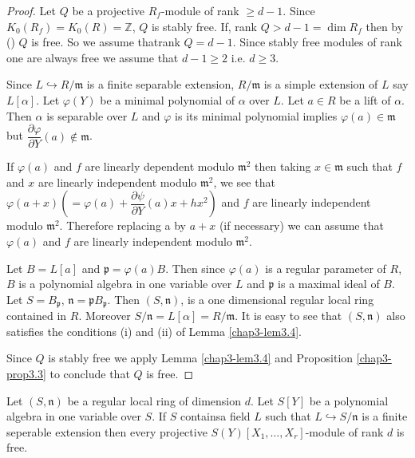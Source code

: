 \begin{proof}
Let $Q$ be a projective $R_{f}$-module of rank $\geq d-1$. Since
$K_{0}(R_{f})=K_{0}(R)=\mathbb{Z}$, $Q$ is stably free. If, rank
$Q>d-1=\dim R_{f}$ then by (\cite[Corollary 3.5, p. 184]{chap3-B}) $Q$ is
free. So we assume that\pageoriginale rank $Q=d-1$. Since stably free
modules of rank one are always free we assume that $d-1\geq 2$
i.e. $d\geq 3$.

Since $L\hookrightarrow R/\mathfrak{m}$ is a finite separable
extension, $R/\mathfrak{m}$ is a simple extension of $L$ say
$L[\alpha]$. Let $\varphi(Y)$ be a minimal polynomial of $\alpha$ over
$L$. Let $a\in R$ be a lift of $\alpha$. Then $\alpha$ is separable
over $L$ and $\varphi$ is its minimal polynomial implies
$\varphi(a)\in \mathfrak{m}$ but $\dfrac{\partial \varphi}{\partial
Y}(a)\not\in \mathfrak{m}$. 

If $\varphi(a)$ and $f$ are linearly dependent modulo
$\mathfrak{m}^{2}$ then taking $x\in \mathfrak{m}$ such that $f$ and
$x$ are linearly independent modulo $\mathfrak{m}^{2}$, we see that
$\varphi(a+x)(=\varphi(a)+\dfrac{\partial\psi}{\partial
Y}(a)x+hx^{2})$ and $f$ are linearly independent modulo
$\mathfrak{m}^{2}$. Therefore replacing a by $a+x$ (if necessary) we
can assume that $\varphi(a)$ and $f$ are linearly independent modulo
$\mathfrak{m}^{2}$. 

Let $B=L[a]$ and $\mathfrak{p}=\varphi(a)B$. Then since $\varphi(a)$
is a regular parameter of $R$, $B$ is a polynomial algebra in one
variable over $L$ and $\mathfrak{p}$ is a maximal ideal of $B$. Let
$S=B_{\mathfrak{p}}$,
$\mathfrak{n}=\mathfrak{p}B_{\mathfrak{p}}$. Then $(S,\mathfrak{n})$,
is a one dimensional regular local ring contained in $R$. Moreover
$S/\mathfrak{n}=L[\alpha]=R/\mathfrak{m}$. It is easy to see that
$(S,\mathfrak{n})$ also satisfies the conditions (i) and (ii) of
Lemma \ref{chap3-lem3.4}. 

Since $Q$ is stably free we apply Lemma \ref{chap3-lem3.4} and
Proposition \ref{chap3-prop3.3} to conclude that $Q$ is free.
\end{proof}

\begin{corollary}\label{chap3-coro3.6}
Let $(S,\mathfrak{n})$ be a regular local ring of dimension $d$. Let
$S[Y]$ be a polynomial algebra in one variable over $S$. If $S$
contains\pageoriginale a field $L$ such that $L\hookrightarrow
S/\mathfrak{n}$ is a finite seperable extension then every projective
$S(Y)[X_{1},\ldots,X_{r}]$-module of rank $d$ is free.
\end{corollary}

